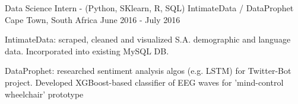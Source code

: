 \begin{cventries}

\cventry
{Data Science Intern - (Python, SKlearn, R, SQL)} %
{IntimateData / DataProphet} %
{Cape Town, South Africa} %
{June 2016 - July 2016} %
{ %
\begin{cvitems}
\item {IntimateData: scraped, cleaned and visualized S.A. demographic and language data. Incorporated into existing MySQL DB.}
\item {DataProphet: researched sentiment analysis algos (e.g. LSTM) for Twitter-Bot project. Developed XGBoost-based classifier of EEG waves for 'mind-control wheelchair' prototype}
\end{cvitems}
}


\end{cventries}
